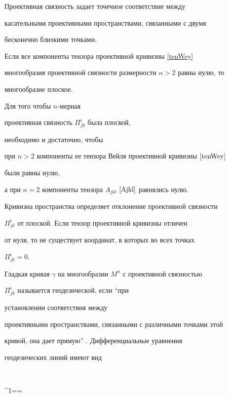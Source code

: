 Проективная связность задает точечное соответствие между


касательными проективными пространствами, связанными с двумя


бесконечно близкими точками.


Если все компоненты тензора проективной кривизны \eqref{tenWey}


многообразия проективной связности размерности $n>2$ равны нулю, то


многообразие плоское.





Для того чтобы $n$-мерная


проективная связность $\Pi^i_{jk}$ была плоской,


необходимо и достаточно, чтобы


при $n>2$ компоненты ее тензора Вейля проективной кривизны $\eqref{tenWey}$


были равны нулю,


а при $n=2$ компоненты тензора $A_{jkl}$ $\eqref{Ajkl}$ равнялись нулю.


Кривизна пространства определяет отклонение проективной связности


$\Pi^{i}_{jk}$ от плоской. Если тензор проективной кривизны отличен


от нуля, то не существует координат, в которых во всех точках


$\Pi^{i}_{jk} = 0$.





Гладкая кривая $\gamma $ на многообразии $M^n$ с проективной связностью


$\Pi^{i}_{jk} $ называется { геодезической}, если ``при


установлении соответствия между


проективными пространствами, связанными с различными точками этой


кривой, она дает прямую'' \cite{Cartan_24}. Дифференциальные уравнения


 геодезических линий имеют вид \cite{Cartan_24}


$$




{\omega^1}=\dotsb=




